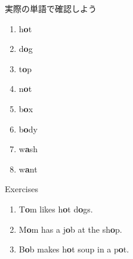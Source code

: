 \documentclass[aspectratio=169,xcolor={dvipsnames,table}]{beamer}
\begin{document}
\begin{frame}[plain]{実際の単語で確認しよう}
\LARGE

\begin{enumerate}
 \item h\textcolor{NavyBlue}{\bfseries o}t%
\hfill{}\hspace{150pt}\mbox{}
 \item d\textcolor{NavyBlue}{\bfseries o}g%
\hfill{}\hspace{150pt}\mbox{} 
\item t\textcolor{NavyBlue}{\bfseries o}p%
\hfill{}\hspace{150pt}\mbox{}
 \item n\textcolor{NavyBlue}{\bfseries o}t%
\hfill{}\hspace{150pt}\mbox{} \item b\textcolor{NavyBlue}{\bfseries o}x%
\hfill{}\hspace{150pt}\mbox{}
 \item b\textcolor{NavyBlue}{\bfseries o}dy%
\hfill{}\hspace{150pt}\mbox{}
 \item w\textcolor{NavyBlue}{\bfseries a}sh%
\hfill{}\hspace{150pt}\mbox{}
 \item w\textcolor{NavyBlue}{\bfseries a}nt%
\hfill{}\hspace{150pt}\mbox{}

\end{enumerate}
\end{frame}
\begin{frame}[plain]{Exercises}
\LARGE

\begin{enumerate}
 \item T\textcolor{NavyBlue}{\bfseries o}m likes h\textcolor{NavyBlue}{\bfseries o}t d\textcolor{NavyBlue}{\bfseries o}gs.
 \item M\textcolor{NavyBlue}{\bfseries o}m has a j\textcolor{NavyBlue}{\bfseries o}b  at the sh\textcolor{NavyBlue}{\bfseries o}p.
 \item B\textcolor{NavyBlue}{\bfseries o}b makes h\textcolor{NavyBlue}{\bfseries o}t soup in a p\textcolor{NavyBlue}{\bfseries o}t.
\end{enumerate}
\end{frame}
\end{document}
